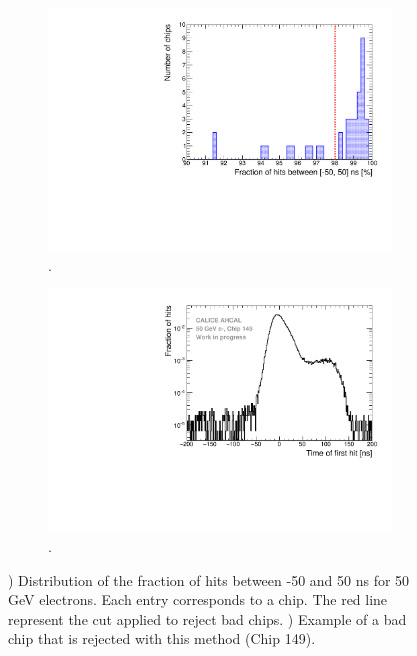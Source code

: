 \begin{figure}[htbp!]
	\begin{subfigure}[t]{0.5\textwidth}
		\centering
		\includegraphics[width=1\linewidth]{../Thesis_Plots/Timing/Electrons/Plots/FractionRejectedChips.pdf}
		\caption{.} \label{fig:FracRejChip}
	\end{subfigure}
	\hfill
	\begin{subfigure}[t]{0.5\textwidth}
		\centering
		\includegraphics[width=1\linewidth]{../Thesis_Plots/Timing/Electrons/Plots/ExampleBadChip149.pdf}
		\caption{.} \label{fig:ExBadChip}
	\end{subfigure}
	\caption{) Distribution of the fraction of hits between -50 and 50 ns for 50 GeV electrons. Each entry corresponds to a chip. The red line represent the cut applied to reject bad chips. ) Example of a bad chip that is rejected with this method (Chip 149).}
\end{figure}
